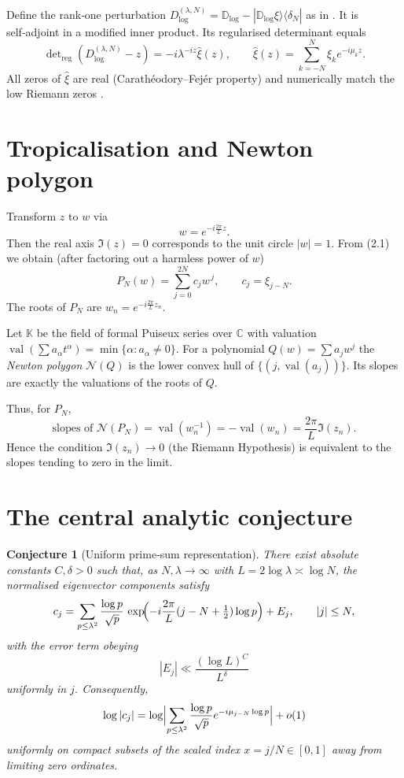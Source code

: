 \documentclass[11pt,a4paper]{article}
\newtheorem{conjecture}[theorem]{Conjecture}
\theoremstyle{definition}
\theoremstyle{remark}
\newcommand{\CC}{\mathbb{C}}
\newcommand{\val}{\operatorname{val}}
\begin{document}
Define the rank‑one perturbation
\(D_{\log}^{(\lambda,N)} = \mathbb{D}_{\log} - |\mathbb{D}_{\log}\xi\rangle\langle\delta_N|\)
as in \cite[\S4]{CCM}.  It is self‑adjoint in a modified inner product.  Its
regularised determinant equals
\[
\det\nolimits_{\mathrm{reg}}(D_{\log}^{(\lambda,N)}-z)
= -i\lambda^{-iz}\widehat{\xi}(z),\qquad
\widehat{\xi}(z)=\sum_{k=-N}^N \xi_k e^{-i\mu_k z}.
\tag{2.1}
\]
All zeros of \(\widehat{\xi}\) are real (Carathéodory--Fejér property) and
numerically match the low Riemann zeros \cite[\S7]{CCM}.

\section{Tropicalisation and Newton polygon}
\label{sec:tropical}

Transform \(z\) to \(w\) via
\[
w = e^{-i\frac{2\pi}{L}z}.
\]
Then the real axis \(\Im(z)=0\) corresponds to the unit circle \(|w|=1\).
From (2.1) we obtain (after factoring out a harmless power of \(w\))
\[
P_N(w) = \sum_{j=0}^{2N} c_j w^{\,j},\qquad
c_j = \xi_{j-N}.
\]
The roots of \(P_N\) are \(w_n = e^{-i\frac{2\pi}{L}z_n}\).

Let \(\mathbb{K}\) be the field of formal Puiseux series over \(\CC\) with
valuation \(\val(\sum a_\alpha t^\alpha)=\min\{\alpha: a_\alpha\neq0\}\).  For
a polynomial \(Q(w)=\sum a_j w^j\) the \emph{Newton polygon} \(\mathcal{N}(Q)\)
is the lower convex hull of \(\{(j,\val(a_j))\}\).  Its slopes are exactly the
valuations of the roots of \(Q\).

Thus, for \(P_N\),
\[
\text{slopes of }\mathcal{N}(P_N) = \val(w_n^{-1}) = -\val(w_n)
= \frac{2\pi}{L}\Im(z_n).
\tag{3.1}
\]
Hence the condition \(\Im(z_n)\to0\) (the Riemann Hypothesis) is equivalent to the
slopes tending to zero in the limit.

\section{The central analytic conjecture}
\label{sec:conjecture}

\begin{conjecture}[Uniform prime‑sum representation]
\label{conj:main}
There exist absolute constants \(C,\delta>0\) such that, as
\(N,\lambda\to\infty\) with \(L=2\log\lambda\asymp\log N\), the normalised
eigenvector components satisfy
\[
c_j = \sum_{p\le\lambda^2} \frac{\log p}{\sqrt{p}}\,
      \exp\!\Bigl(-i\frac{2\pi}{L}(j-N+\tfrac12)\log p\Bigr) + E_j,
\qquad |j|\le N,
\]
with the error term obeying
\[
|E_j| \ll \frac{(\log L)^C}{L^\delta}
\]
uniformly in \(j\).  Consequently,
\[
\log|c_j| = \log\Bigl|\sum_{p\le\lambda^2}\frac{\log p}{\sqrt{p}}
            e^{-i\mu_{j-N}\log p}\Bigr| + o(1)
\]
uniformly on compact subsets of the scaled index \(x=j/N\in[0,1]\) away from
limiting zero ordinates.
\end{conjecture}
\end{document}
